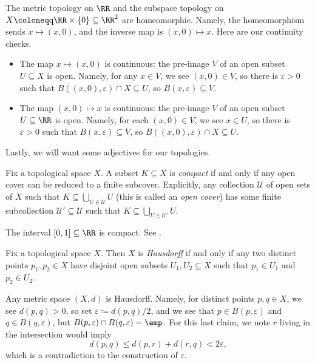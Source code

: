 \documentclass[../notes.tex]{subfiles}
\begin{document}
\begin{example} \label{ex:basic-homeo}
	The metric topology on $\RR$ and the subspace topology on $X\coloneqq\RR\times\{0\}\subseteq\RR^2$ are homeomorphic. Namely, the homeomorphism sends $x\mapsto(x,0)$, and the inverse map is $(x,0)\mapsto x$. Here are our continuity checks.
	\begin{itemize}
		\item The map $x\mapsto(x,0)$ is continuous: the pre-image $V$ of an open subset $U\subseteq X$ is open. Namely, for any $x\in V$, we see $(x,0)\in V$, so there is $\varepsilon>0$ such that $B((x,0),\varepsilon)\cap X\subseteq U$, so $B(x,\varepsilon)\subseteq V$.
		\item The map $(x,0)\mapsto x$ is continuous: the pre-image $V$ of an open subset $U\subseteq\RR$ is open. Namely, for each $(x,0)\in V$, we see $x\in U$, so there is $\varepsilon>0$ such that $B(x,\varepsilon)\subseteq V$, so $B((x,0),\varepsilon)\cap X\subseteq U$.
	\end{itemize}
\end{example}
Lastly, we will want some adjectives for our topologies.
\begin{definition}[compact]
	Fix a topological space $X$. A subset $K\subseteq X$ is \textit{compact} if and only if any open cover can be reduced to a finite subcover. Explicitly, any collection $\mathcal U$ of open sets of $X$ such that $K\subseteq\bigcup_{U\in\mathcal U}U$ (this is called an \textit{open cover}) has some finite subcollection $\mathcal U'\subseteq\mathcal U$ such that $K\subseteq\bigcup_{U\in\mathcal U'}U$.
\end{definition}
\begin{example}
	The interval $[0,1]\subseteq\RR$ is compact. See \cite[Example~4.4]{elber-top}.
\end{example}
\begin{definition}[Hausdorff]
	Fix a topological space $X$. Then $X$ is \textit{Hausdorff} if and only if any two distinct points $p_1,p_2\in X$ have disjoint open subsets $U_1,U_2\subseteq X$ such that $p_1\in U_1$ and $p_2\in U_2$.
\end{definition}
\begin{example}
	Any metric space $(X,d)$ is Hausdorff. Namely, for distinct points $p,q\in X$, we see $d(p,q)>0$, so set $\varepsilon\coloneqq d(p,q)/2$, and we see that $p\in B(p,\varepsilon)$ and $q\in B(q,\varepsilon)$, but $B(p,\varepsilon)\cap B(q,\varepsilon)=\emp$. For this last claim, we note $r$ living in the intersection would imply
	\[d(p,q)\le d(p,r)+d(r,q)<2\varepsilon,\]
	which is a contradiction to the construction of $\varepsilon$.
\end{example}
\end{document}
